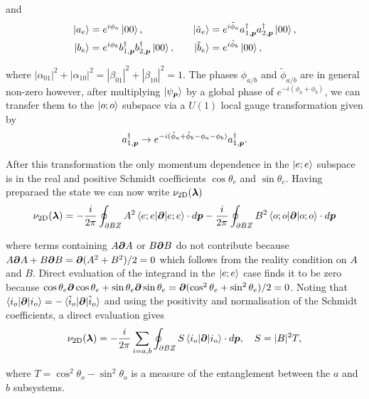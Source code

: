 \noi and
\begin{align}
\ket{a_{e}}&=e^{i\phi_{a}}\ket{00}, \quad &\ket{\tilde{a}_{e}}&=e^{i\tilde{\phi}_{a}}a_{1,\boldsymbol{p}}^{\dagger}a_{2,\boldsymbol{p}}^{\dagger}\ket{00},\nonumber\\
\ket{b_{e}}&=e^{i\phi_{b}}b_{1,\boldsymbol{p}}^{\dagger}b_{2,\boldsymbol{p}}^{\dagger}\ket{00}, \quad &\ket{\tilde{b}_{e}}&=e^{i\tilde{\phi}_{b}}\ket{00},
\end{align}

\noi where $|\alpha_{01}|^{2}+|\alpha_{10}|^{2}=|\beta_{01}|^{2}+|\beta_{10}|^{2}=1$. The phases $\phi_{a/b}$ and $\tilde{\phi}_{a/b}$ are in general non-zero however, after multiplying $\ket{\psi_{\boldsymbol{p}}}$ by a global phase of $e^{-i(\phi_{a}+\phi_{b})}$, we can transfer them to the $\ket{o;o}$ subspace via a $U(1)$ local gauge transformation given by
\begin{equation}
    a^{\dagger}_{1,\boldsymbol{p}}\rightarrow e^{-i(\tilde{\phi}_{a}+\tilde{\phi}_{b}-\phi_{a}-\phi_{b})}a^{\dagger}_{1,\boldsymbol{p}}.
\end{equation}

\noi After this transformation the only momentum dependence in the $\ket{e;e}$ subspace is in the real and positive Schmidt coefficients $\cos\theta_{e}$ and $\sin\theta_{e}$. Having preparaed the state we can now write $\nu_{\text{2D}}(\boldsymbol{\lambda})$
\begin{equation}
    \nu_{\text{2D}}(\boldsymbol{\lambda})=-\frac{i}{2\pi}\oint_{\partial BZ} A^{2}\braket{e;e|\boldsymbol{\partial}|e;e}\cdot d\boldsymbol{p}-\frac{i}{2\pi}\oint_{\partial BZ} B^{2}\braket{o;o|\boldsymbol{\partial}|o;o}\cdot d\boldsymbol{p}
\end{equation}

\noi where terms containing $A\boldsymbol{\partial}A$ or $B\boldsymbol{\partial}B$ do not contribute because $A\boldsymbol{\partial}A+B\boldsymbol{\partial}B=\boldsymbol{\partial}(A^{2}+B^{2})/2=0$ which follows from the reality condition on $A$ and $B$. Direct evaluation of the integrand in the $\ket{e;e}$ case finds it to be zero because $\cos\theta_{e}\boldsymbol{\partial}\cos\theta_{e}+\sin\theta_{e}\boldsymbol{\partial}\sin\theta_{e}=\boldsymbol{\partial}(\cos^{2}\theta_{e}+\sin^{2}\theta_{e})/2=0$. Noting that $\braket{i_{o}|\boldsymbol{\partial}|i_{o}}=-\braket{\tilde{i}_{o}|\boldsymbol{\partial}|\tilde{i}_{o}}$ and using the positivity and normalisation of the Schmidt coefficients, a direct evaluation gives
\begin{equation}\label{eqn:SUMBERRY}
    \nu_{\text{2D}}(\boldsymbol{\lambda})=-\frac{i}{2\pi}\sum_{i=a,b}\oint_{\partial BZ} S\braket{i_{o}|\boldsymbol{\partial}|i_{o}}\cdot d\boldsymbol{p}, \quad S=|B|^{2}T,
\end{equation}

\noi where $T=\cos^{2}\theta_{o}-\sin^{2}\theta_{o}$ is a measure of the entanglement between the $a$ and $b$ subsystems.\\

